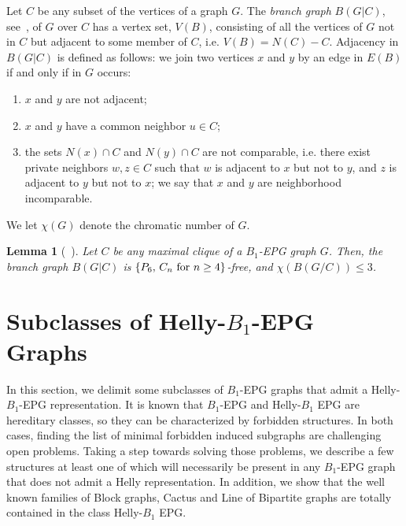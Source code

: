 \documentclass[9pt]{entcs}
\newtheorem{lema}[thm]{Lemma}%
\newcommand{\la}[1]{\textcolor{blue}{\sf{#1}}}%
\begin{document}
Let $C$ be any subset of the vertices of a graph $G$. The \textit{branch graph} $B(G|C)$, see~\cite{golumbic2009}, of $G$ over $C$ has a vertex set, $V(B)$, consisting of all the vertices of $G$ not in $C$ but adjacent to some member of $C$, i.e. $V(B) = N(C) - C$. Adjacency in $B(G|C)$ is defined as follows: we join two vertices $x$ and $y$ by an edge in $E(B)$ if and only if in $G$ occurs:
\begin{enumerate}
    \item  $x$ and $y$ are not adjacent;
    \item $x$ and $y$ have a common neighbor $u \in C$;
    \item the sets $N(x) \cap C$ and $N(y) \cap C$ are not comparable, i.e. there exist private neighbors $w, z \in C$ such that $w$ is adjacent to $x$ but not to $y$, and $z$ is adjacent to $y$ but not to $x$; we say that $x$ and $y$ are neighborhood incomparable.
\end{enumerate}

We let  $\chi(G)$ denote the chromatic number of $G$. 

\begin{lema}[~\cite{golumbic2009}] \label{l:branch} Let $C$ be any maximal clique of a $B_1$-EPG  graph $G$. Then, the branch graph $B(G|C)$ is $\{P_6, \, C_n \hbox{ for }  n\geq 4\}$-free, and $\chi(B(G/C))\leq 3$.
\end{lema}





\section{Subclasses of Helly-$B_1$-EPG Graphs}

In this section, we delimit some  subclasses of $B_1$-EPG graphs that admit a Helly-$B_1$-EPG representation. It is known that $B_1$-EPG and Helly-$B_1$ EPG 
are hereditary classes, so they can  be characterized by forbidden structures. 
In both cases, finding the list of minimal forbidden induced subgraphs are challenging open problems.
Taking a step towards solving
those problems,  we describe a few structures %
at least one of which will  necessarily be present in  any $B_1$-EPG graph that does not admit a Helly representation. 
In addition,
we show that the well known families of Block graphs, Cactus and Line of Bipartite graphs are totally contained in the class Helly-$B_1$ EPG.
\end{document}
